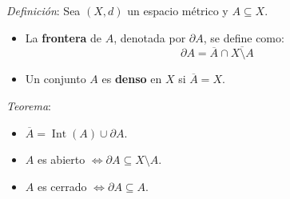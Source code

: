 \documentclass{beamer}
\begin{document}
  \begin{frame}
    \textit{Definición}: Sea $(X, d)$ un espacio métrico y $A \subseteq X$.
    \newline

    \begin{itemize}[<+->]
      \item La \textbf{frontera} de $A$, denotada por $\partial A$, se define como:
            \[ \partial A = \overline{A} \cap \overline{X \setminus A} \]
      \item Un conjunto $A$ es \textbf{denso} en $X$ si $\overline{A} = X$.
    \end{itemize}

    \pause
    \vspace{0.5em}
    \textit{Teorema}:
    \newline

    \begin{itemize}[<+->]
      \item $\overline{A} = \operatorname{Int}(A) \cup \partial A$.
      \item $A$ es abierto $\iff \partial A \subseteq X \setminus A$.
      \item $A$ es cerrado $\iff \partial A \subseteq A$.
    \end{itemize}
  \end{frame}
\end{document}
